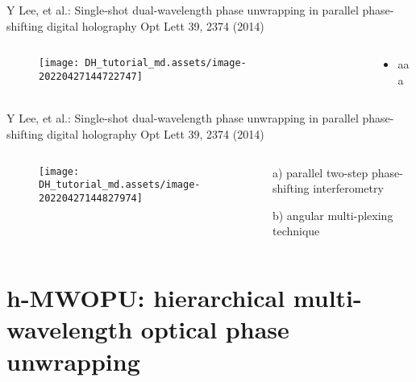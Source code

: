 \documentclass[t, aspectratio=169]{beamer}
\begin{document}
\begin{frame}{Y Lee, et al.: Single-shot dual-wavelength phase unwrapping in parallel phase-shifting digital holography}
	\vspace{-3 mm}
	\small Opt Lett 39, 2374 (2014)
	\begin{columns}
		\begin{column}{.6\textwidth}
			\vspace{-5 mm}
			\begin{figure}
				\texttt{[image: DH\_tutorial\_md.assets/image-20220427144722747]}
			\end{figure}
		\end{column}
		\begin{column}{.4\textwidth}
			\begin{itemize}
				\item aaa
			\end{itemize}
		\end{column}
	\end{columns}
\end{frame}


\begin{frame}{Y Lee, et al.: Single-shot dual-wavelength phase unwrapping in parallel phase-shifting digital holography}
	\vspace{-3 mm}
	\small Opt Lett 39, 2374 (2014)
	\begin{columns}
		\begin{column}{.6\textwidth}
			\vspace{-5 mm}
			\begin{figure}
				\texttt{[image: DH\_tutorial\_md.assets/image-20220427144827974]}
			\end{figure}
		\end{column}
		\begin{column}{.4\textwidth}
			\begin{itemize}
				\item[a) ] parallel two-step phase-shifting interferometry
				\item[b) ] angular multi-plexing technique
			\end{itemize}
		\end{column}
	\end{columns}
\end{frame}


\section{h-MWOPU: hierarchical multi-wavelength optical phase unwrapping}
\begin{frame}[c]
	\centering\LARGE\textbf{\secname}
\end{frame}
\end{document}
